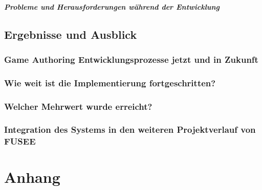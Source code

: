 \documentclass[pagesize, paper=a4, fontsize=12pt,titlepage=true, headings=small, headnosepline, abstractoff, liststotoc, nochapterprefix, plainheadsepline, twoside]{scrreprt}
\begin{document}
\subsubsection{Probleme und Herausforderungen während der Entwicklung}



\chapter{Ergebnisse und Ausblick}
\section{Game Authoring Entwicklungsprozesse jetzt und in Zukunft}
\section{Wie weit ist die Implementierung fortgeschritten?}
\section{Welcher Mehrwert wurde erreicht?}
\section{Integration des Systems in den weiteren Projektverlauf von FUSEE}


\part*{Anhang}


\lstlistoflistings

\end{document}
